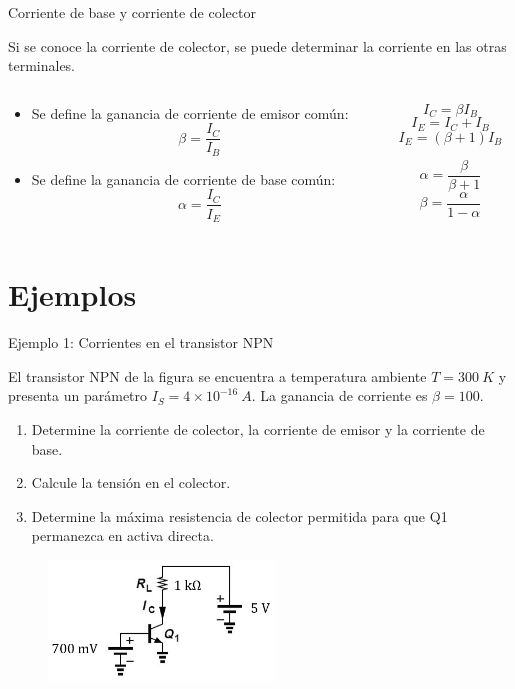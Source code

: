 \documentclass[t,aspectratio=169]{beamer}
\begin{document}
\begin{frame}{Corriente de base y corriente de colector}

Si se conoce la corriente de colector, se puede determinar la corriente en las otras terminales.

\begin{columns}
\begin{column}{0.5\textwidth}
    \begin{itemize}
        \item Se define la ganancia de corriente de emisor común:
        \[ \beta = \dfrac{I_C}{I_B} \]
        \item Se define la ganancia de corriente de base común:
        \[ \alpha = \dfrac{I_C}{I_E} \]
    \end{itemize}
\end{column}
\begin{column}{0.5\textwidth}

\[ I_C = \beta I_B \]
%
\[ I_E = I_C + I_B \]
%
\[ I_E = (\beta + 1) I_B \]

\vspace{5mm}
\[ \alpha = \dfrac{\beta}{\beta + 1} \]
%
\[ \beta = \dfrac{\alpha}{1 - \alpha} \]
\end{column}
\end{columns}

\end{frame}


\section{Ejemplos}
\begin{frame}{Ejemplo 1: Corrientes en el transistor NPN}

El transistor NPN de la figura se encuentra a temperatura ambiente $T=300\ K$ y presenta un parámetro $I_S = 4 \times 10^{-16}\ A$. La ganancia de corriente es $\beta = 100$.

\begin{enumerate}
    \item Determine la corriente de colector, la corriente de emisor y la corriente de base.
    \item Calcule la tensión en el colector.
    \item Determine la máxima resistencia de colector permitida para que Q1 permanezca en activa directa.
\end{enumerate}

\begin{figure}
    \centering
    \includegraphics[width=6cm]{figures/ejemplo_1.png}
\end{figure}

\end{frame}
\end{document}
